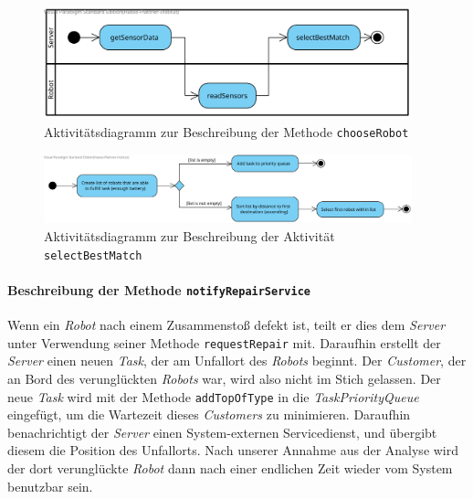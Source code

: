 			\begin{figure}[H]
			\centering
			\includegraphics[width=0.95\textwidth]{img/1-Analyse-3-Choose_Robot}
			\caption{Aktivitätsdiagramm zur Beschreibung der Methode \texttt{chooseRobot}}
			\label{SequenzQueueRemove}
			\end{figure}			
				
			\begin{figure}[H]
			\centering
			\includegraphics[width=0.95\textwidth]{img/2-Entwurf-SelectBestMatch}
			\caption{Aktivitätsdiagramm zur Beschreibung der Aktivität \texttt{selectBestMatch}}
			\label{SequenzQueueRemove}
			\end{figure}

			\paragraph{Beschreibung der Methode \texttt{notifyRepairService}}
			Wenn ein \textit{Robot} nach einem Zusammenstoß defekt ist, teilt er dies dem \textit{Server} unter Verwendung seiner Methode \texttt{requestRepair} mit.	Daraufhin erstellt der \textit{Server} einen neuen  \textit{Task}, der am Unfallort des \textit{Robots} beginnt. Der \textit{Customer}, der an Bord des verunglückten \textit{Robots} war, wird also nicht im Stich gelassen. Der neue \textit{Task} wird mit der Methode \texttt{addTopOfType} in die \textit{TaskPriorityQueue} eingefügt, um die Wartezeit dieses \textit{Customers} zu minimieren. Daraufhin benachrichtigt der \textit{Server} einen System-externen Servicedienst, und übergibt diesem die Position des Unfallorts. Nach unserer Annahme aus der Analyse wird der dort verunglückte \textit{Robot} dann nach einer endlichen Zeit wieder vom System benutzbar sein.
			
			
			
